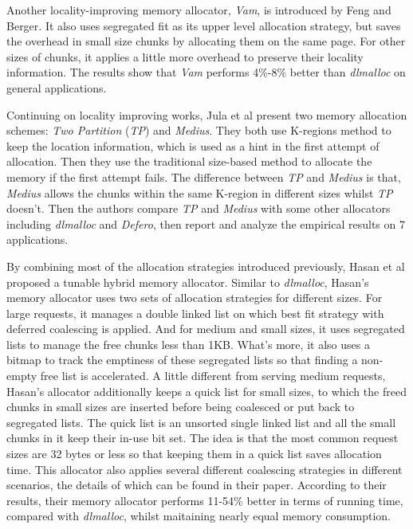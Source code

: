 \documentclass{acm_proc_article-sp}
\begin{document}
Another locality-improving memory allocator, \emph{Vam}, is introduced by Feng and Berger\cite{Feng:2005:LDM:1111583.1111594}. It also uses segregated fit as its upper level allocation strategy, but saves the overhead in small size chunks by allocating them on the same page. For other sizes of chunks, it applies a little more overhead to preserve their locality information. The results show that \emph{Vam} performs 4\%-8\% better than \emph{dlmalloc} on general applications.

Continuing on locality improving works, Jula et al\cite{Jula:2009:TMA:1542431.1542447} present two memory allocation schemes: \emph{Two Partition} (\emph{TP}) and \emph{Medius}. They both use K-regions method to keep the location information, which is used as a hint in the first attempt of allocation. Then they use the traditional size-based method to allocate the memory if the first attempt fails. The difference between \emph{TP} and \emph{Medius} is that, \emph{Medius} allows the chunks within the same K-region in different sizes whilst \emph{TP} doesn't. Then the authors compare \emph{TP} and \emph{Medius} with some other allocators including \emph{dlmalloc} and \emph{Defero}, then report and analyze the empirical results on 7 applications.

By combining most of the allocation strategies introduced previously, Hasan et al\cite{Hasan20061051} proposed a tunable hybrid memory allocator. Similar to \emph{dlmalloc}, Hasan's memory allocator uses two sets of allocation strategies for different sizes. For large requests, it manages a double linked list on which best fit strategy with deferred coalescing is applied. And for medium and small sizes, it uses segregated lists to manage the free chunks less than 1KB. What's more, it also uses a bitmap to track the emptiness of these segregated lists so that finding a non-empty free list is accelerated. A little different from serving medium requests, Hasan's allocator additionally keeps a quick list for small sizes, to which the freed chunks in small sizes are inserted before being coalesced or put back to segregated lists. The quick list is an unsorted single linked list and all the small chunks in it keep their in-use bit set. The idea is that the most common request sizes are 32 bytes or less\cite{Zorn:1992:EMS:142181.142200} so that keeping them in a quick list saves allocation time. This allocator also applies several different coalescing strategies in different scenarios, the details of which can be found in their paper. According to their results, their memory allocator performs 11-54\% better in terms of running time, compared with \emph{dlmalloc}, whilst maitaining nearly equal memory consumption.
\end{document}
